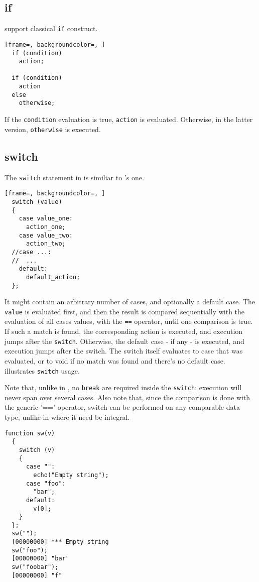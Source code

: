 \documentclass[openright,twoside,12pt]{report}
\begin{document}
\subsection{if}

\us support classical \lstinline|if| construct.

\begin{lstlisting}[frame=, backgroundcolor=, ]
  if (condition)
    action;

  if (condition)
    action
  else
    otherwise;
\end{lstlisting}

If the \lstinline|condition| evaluation is true, \lstinline|action| is
evaluated. Otherwise, in the latter version, \lstinline|otherwise| is
executed.

\subsection{switch}

The \lstinline|switch| statement in \us is similiar to \C's one.

\begin{lstlisting}[frame=, backgroundcolor=, ]
  switch (value)
  {
    case value_one:
      action_one;
    case value_two:
      action_two;
  //case ...:
  //  ...
    default:
      default_action;
  };
\end{lstlisting}

It might contain an arbitrary number of cases, and optionally a
default case. The \lstinline|value| is evaluated first, and then the
result is compared sequentially with the evaluation of all cases
values, with the \lstinline|==| operator, until one comparison is
true. If such a match is found, the corresponding action is executed,
and execution jumps after the \lstinline|switch|. Otherwise, the
default case - if any - is executed, and execution jumps after the
switch. The switch itself evaluates to case that was evaluated, or to
void if no match was found and there's no default case. 
illustrates \lstinline|switch| usage.

Note that, unlike in \C, no \lstinline|break| are required inside the
\lstinline|switch|: execution will never span over several cases. Also
note that, since the comparison is done with the generic '=='
operator, switch can be performed on any comparable data type, unlike
in \C where it need be integral.

\begin{lstlisting}[caption=The \lstinline|switch| construct,
  label=lst:switch, float=\floatpos]
  function sw(v)
  {
    switch (v)
    {
      case "":
        echo("Empty string");
      case "foo":
        "bar";
      default:
        v[0];
    }
  };
  sw("");
  [00000000] *** Empty string
  sw("foo");
  [00000000] "bar"
  sw("foobar");
  [00000000] "f"
\end{lstlisting}
\end{document}
